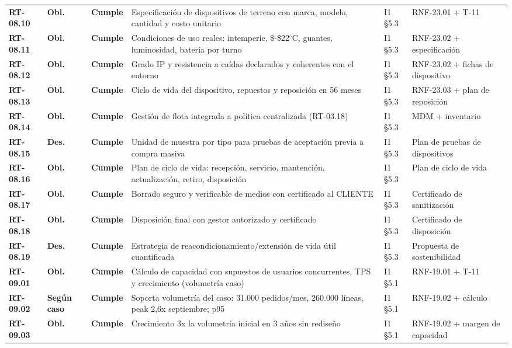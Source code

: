 \begin{small}
\begin{longtable}{@{}p{1.35cm} p{1.15cm} p{1.15cm} p{4.6cm} p{2.35cm} p{3.8cm}@{}}
\textbf{RT-08.10} & \textbf{Obl.} & \textbf{Cumple} & Especificaci\'on de dispositivos de terreno con marca, modelo, cantidad y costo unitario & I1 §5.3 & RNF-23.01 + T-11 \\
\textbf{RT-08.11} & \textbf{Obl.} & \textbf{Cumple} & Condiciones de uso reales: intemperie, \$-\$22$^{\circ}$C, guantes, luminosidad, bater\'ia por turno & I1 §5.3 & RNF-23.02 + especificaci\'on \\
\textbf{RT-08.12} & \textbf{Obl.} & \textbf{Cumple} & Grado IP y resistencia a ca\'idas declarados y coherentes con el entorno & I1 §5.3 & RNF-23.02 + fichas de dispositivo \\
\textbf{RT-08.13} & \textbf{Obl.} & \textbf{Cumple} & Ciclo de vida del dispositivo, repuestos y reposici\'on en 56 meses & I1 §5.3 & RNF-23.03 + plan de reposici\'on \\
\textbf{RT-08.14} & \textbf{Obl.} & \textbf{Cumple} & Gesti\'on de flota integrada a pol\'itica centralizada (RT-03.18) & I1 §5.3 & MDM + inventario \\
\textbf{RT-08.15} & \textbf{Des.} & \textbf{Cumple} & Unidad de muestra por tipo para pruebas de aceptaci\'on previa a compra masiva & I1 §5.3 & Plan de pruebas de dispositivos \\
\textbf{RT-08.16} & \textbf{Obl.} & \textbf{Cumple} & Plan de ciclo de vida: recepci\'on, servicio, mantenci\'on, actualizaci\'on, retiro, disposici\'on & I1 §5.3 & Plan de ciclo de vida \\
\textbf{RT-08.17} & \textbf{Obl.} & \textbf{Cumple} & Borrado seguro y verificable de medios con certificado al CLIENTE & I1 §5.3 & Certificado de sanitizaci\'on \\
\textbf{RT-08.18} & \textbf{Obl.} & \textbf{Cumple} & Disposici\'on final con gestor autorizado y certificado & I1 §5.3 & Certificado de disposici\'on \\
\textbf{RT-08.19} & \textbf{Des.} & \textbf{Cumple} & Estrategia de reacondicionamiento/extensi\'on de vida \'util cuantificada & I1 §5.3 & Propuesta de sostenibilidad \\
\textbf{RT-09.01} & \textbf{Obl.} & \textbf{Cumple} & C\'alculo de capacidad con supuestos de usuarios concurrentes, TPS y crecimiento (volumetr\'ia caso) & I1 §5.1 & RNF-19.01 + T-11 \\
\textbf{RT-09.02} & \textbf{Según caso} & \textbf{Cumple} & Soporta volumetr\'ia del caso: 31.000 pedidos/mes, 260.000 l\'ineas, peak 2,6x septiembre; p95 & I1 §5.1 & RNF-19.02 + c\'alculo \\
\textbf{RT-09.03} & \textbf{Obl.} & \textbf{Cumple} & Crecimiento 3x la volumetr\'ia inicial en 3 a\~nos sin redise\~no & I1 §5.1 & RNF-19.02 + margen de capacidad \\

\end{longtable}
\end{small}
